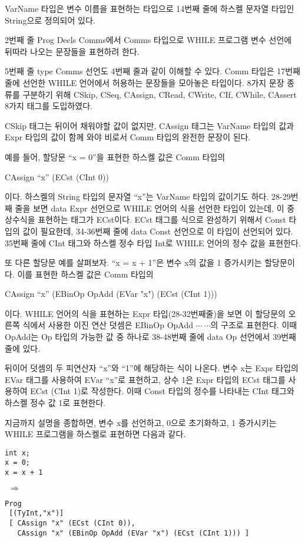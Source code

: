 \documentclass[a4paper]{book}
\begin{document}
VarName 타입은 변수 이름을 표현하는 타입으로 14번째 줄에 하스켈 문자열
타입인 String으로 정의되어 있다.

2번째 줄 Prog Decls Comms에서 Comms 타입으로 WHILE 프로그램 변수
선언에 뒤따라 나오는 문장들을 표현하려 한다.

5번째 줄 type Comms 선언도 4번째 줄과 같이 이해할 수 있다. Comm 타입은
17번째 줄에 선언한 WHILE 언어에서 허용하는 문장들을 모아놓은 타입이다.
8가지 문장 종류를 구분하기 위해 CSkip, CSeq, CAssign, CRead, CWrite,
CIf, CWhile, CAssert 8가지 태그를 도입하였다.

CSkip 태그는 뒤이어 채워야할 값이 없지만, CAssign 태그는 VarName
타입의 값과 Expr 타입의 값이 함께 와야 비로서 Comm 타입의 완전한
문장이 된다.

예를 들어, 할당문 ``x = 0''을 표현한 하스켈 값은 Comm 타입의 
\begin{center}
  CAssign ``x'' (ECst (CInt 0))
\end{center}
이다. 하스켈의 String 타입의 문자열 ``x''는 VarName 타입의 값이기도
하다. 28-29번째 줄을 보면 data Expr 선언으로 WHILE 언어의 식을 선언한
타입이 있는데, 이 중 상수식을 표현하는 태그가 ECst이다. ECst 태그를
식으로 완성하기 위해서 Const 타입의 값이 필요한데, 34-36번째 줄에 data
Const 선언으로 이 타입이 선언되어 있다. 35번째 줄에 CInt 태그와 하스켈 정수 타입 Int로 WHILE 언어의 정수 값을 표현한다.

또 다른 할당문 예를 살펴보자. ``x = x + 1''은 변수 x의 값을 1 증가시키는 할당문이다. 이를 표현한 하스켈 값은 Comm 타입의 
\begin{center}
  CAssign ``x'' (EBinOp OpAdd (EVar "x") (ECst (CInt 1)))
\end{center}
이다. WHILE 언어의 식을 표현하는 Expr 타입(28-32번째줄)을 보면 이
할당문의 오른쪽 식에서 사용한 이진 연산 덧셈은 EBinOp OpAdd $\cdots
\ \cdots$의 구조로 표현한다. 이때 OpAdd는 Op 타입의 가능한 값 중
하나로 38-48번째 줄에 data Op 선언에서 39번째 줄에 있다.

뒤이어 덧셈의 두 피연산자 ``x''와 ``1''에 해당하는 식이 나온다. 변수
x는 Expr 타입의 EVar 태그를 사용하여 EVar ``x''로 표현하고, 상수 1은
Expr 타입의 ECst 태그를 사용하여 ECst (CInt 1)로 작성한다. 이때 Const
타입의 정수를 나타내는 CInt 태그와 하스켈 정수 값 1로 표현한다.

지금까지 설명을 종합하면, 변수 x를 선언하고, 0으로 초기화하고, 1 증가시키는 WHILE 프로그램을 하스켈로 표현하면 다음과 같다.

{\footnotesize
 \begin{minipage}[h]{0.15\textwidth}
\begin{verbatim}
int x;
x = 0;
x = x + 1
\end{verbatim}
\end{minipage}
$\ \ \Rightarrow \ \ $
\begin{minipage}[h]{0.6\textwidth}
\begin{verbatim}
Prog
 [(TyInt,"x")]
 [ CAssign "x" (ECst (CInt 0)),
   CAssign "x" (EBinOp OpAdd (EVar "x") (ECst (CInt 1))) ]
\end{verbatim}
\end{minipage}
}
\end{document}
